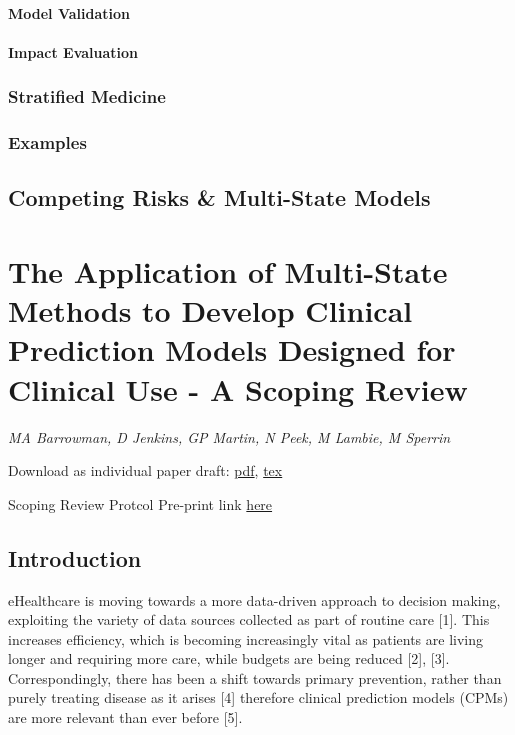\documentclass[12pt,PhD,twoside,openright]{muthesis}
\begin{document}
\hypertarget{model-validation}{%
\subsubsection{Model Validation}\label{model-validation}}

\hypertarget{impact-evaluation}{%
\subsubsection{Impact Evaluation}\label{impact-evaluation}}

\hypertarget{stratified-medicine}{%
\subsection{Stratified Medicine}\label{stratified-medicine}}

\hypertarget{examples}{%
\subsection{Examples}\label{examples}}

\hypertarget{competing-risks-multi-state-models}{%
\section{Competing Risks \& Multi-State Models}\label{competing-risks-multi-state-models}}

\hypertarget{chap-scoping-review}{%
\chapter{The Application of Multi-State Methods to Develop Clinical Prediction Models Designed for Clinical Use - A Scoping Review}\label{chap-scoping-review}}

\emph{MA Barrowman, D Jenkins, GP Martin, N Peek, M Lambie, M Sperrin}

Download as individual paper draft: \href{Chapters/ind_02-Scoping_Review_Paper.pdf}{pdf}, \href{Chapters/ind_02-Scoping_Review_Paper.tex}{tex}

Scoping Review Protcol Pre-print link \href{https://doi.org/10.17605/OSF.IO/HR6QD}{here}

\hypertarget{introduction-2}{%
\section{Introduction}\label{introduction-2}}

eHealthcare is moving towards a more data-driven approach to decision making, exploiting the variety of data sources collected as part of routine care {[}1{]}. This increases efficiency, which is becoming increasingly vital as patients are living longer and requiring more care, while budgets are being reduced {[}2{]}, {[}3{]}. Correspondingly, there has been a shift towards primary prevention, rather than purely treating disease as it arises {[}4{]} therefore clinical prediction models (CPMs) are more relevant than ever before {[}5{]}.
\end{document}
